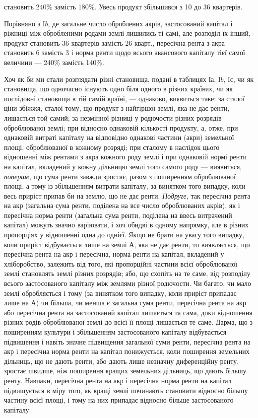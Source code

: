 \parcont{}  %
становить 240\% замість 180\%. Увесь продукт збільшився з 10 до
36 квартерів.

Порівняно з І$b$, де загальне число оброблених акрів, застосований капітал
і ріжниці між обробленими родами землі лишились ті самі, але розподіл
їх інший, продукт становить 36 квартерів замість 26 кварт., пересічна рента
з акра становить 6 замість 3 і норма ренти щодо всього авансового
капіталу тієї самої величини — 240\% замість 140\%.

Хоч як би ми стали розглядати різні становища, подані в таблицях І$а$,
І$b$, І$с$, чи як становища, що одночасно існують одно біля одного в різних країнах,
чи як послідовні становища в тій самій країні, — однаково, виявиться таке:
за сталої ціни збіжжя, сталої тому, що продукт з найгіршої землі, яка не дає
ренти, лишається той самий; за незмінної різниці у родючости різних розрядів
оброблюваної землі; при відносно однаковій кількості продукту, а, отже,
при однаковій витраті капіталу на відповідно однакові частини (акри) земельної
площі, оброблюваної в кожному розряді; при сталому в наслідок цього
відношенні між рентами з акра кожного роду землі і при однаковій нормі ренти
на капітал, вкладений у кожну дільницю землі того самого роду — виявиться,
\emph{поперше}, що сума ренти завжди зростає, разом з поширенням оброблюваної
площі, а тому із збільшенням витрати капіталу, за винятком того випадку, коли
весь приріст припав би на землю, що не дає ренти. \emph{Подруге}, так пересічна
рента на акр (загальна сума ренти, поділена на все число оброблюваних
акрів), як і пересічна норма ренти (загальна сума ренти, поділена на ввесь
витрачений капітал) можуть значно варіювати, і хоч обидві в одному напрямку,
але в різних пропорціях у відношенні одна до однієї. Якщо не брати
на увагу того випадку, коли приріст відбувається лише на землі $А$,
яка не дає ренти, то виявляється, що пересічна рента на акр і пересічна,
норма ренти на капітал, вкладений у хліборобство, залежить від того, які пропорційні
частини всієї оброблюваної землі становлять землі різних розрядів;
або, що схопіть на те саме, від розподілу всього застосованого капіталу між
землями різної родючости. Чи багато, чи мало землі обробляється і тому (за
винятком того випадку, коли приріст припадає лише на $А$) чи більша, чи
менша є загальна сума ренти, пересічна рента на акр або пересічна рента на
застосований капітал лишається та сама, доки відношення різних родів оброблюваної
землі до всієї її площі лишається те саме. Дарма, що з поширенням
культури і збільшенням застосованого капіталу відбувається підвищення і
навіть значне підвищення загальної суми ренти, пересічна рента на акр і
пересічна норма ренти на капітал понижується, коли поширення земельних
дільниць, що не дають ренти, або дають лише незначну диференційну ренту,
зростає швидше, ніж поширення кращих земельних дільниць, що дають більшу
ренту. Навпаки, пересічна рента на акр і пересічна норма ренти на капітал підвищується в міру того,
як кращі землі починають становити відносно більшу
частину всієї площі, і тому на них припадає відносно більше застосованого
капіталу.

